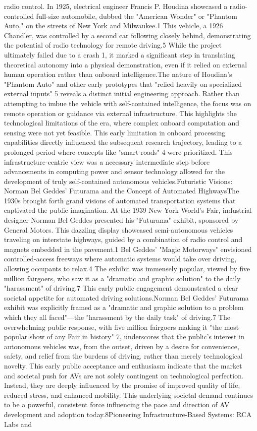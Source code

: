 radio control. In 1925, electrical engineer Francis P. Houdina showcased a radio-controlled full-size automobile, dubbed the "American Wonder" or "Phantom Auto," on the streets of New York and Milwaukee.1 This vehicle, a 1926 Chandler, was controlled by a second car following closely behind, demonstrating the potential of radio technology for remote driving.5 While the project ultimately failed due to a crash 1, it marked a significant step in translating theoretical autonomy into a physical demonstration, even if it relied on external human operation rather than onboard intelligence.The nature of Houdina's "Phantom Auto" and other early prototypes that "relied heavily on specialized external inputs" 5 reveals a distinct initial engineering approach. Rather than attempting to imbue the vehicle with self-contained intelligence, the focus was on remote operation or guidance via external infrastructure. This highlights the technological limitations of the era, where complex onboard computation and sensing were not yet feasible. This early limitation in onboard processing capabilities directly influenced the subsequent research trajectory, leading to a prolonged period where concepts like "smart roads" 4 were prioritized. This infrastructure-centric view was a necessary intermediate step before advancements in computing power and sensor technology allowed for the development of truly self-contained autonomous vehicles.Futuristic Visions: Norman Bel Geddes' Futurama and the Concept of Automated HighwaysThe 1930s brought forth grand visions of automated transportation systems that captivated the public imagination. At the 1939 New York World's Fair, industrial designer Norman Bel Geddes presented his "Futurama" exhibit, sponsored by General Motors. This dazzling display showcased semi-autonomous vehicles traveling on interstate highways, guided by a combination of radio control and magnets embedded in the pavement.1 Bel Geddes' "Magic Motorways" envisioned controlled-access freeways where automatic systems would take over driving, allowing occupants to relax.4 The exhibit was immensely popular, viewed by five million fairgoers, who saw it as a "dramatic and graphic solution" to the daily "harassment" of driving.7 This early public engagement demonstrated a clear societal appetite for automated driving solutions.Norman Bel Geddes' Futurama exhibit was explicitly framed as a "dramatic and graphic solution to a problem which they all faced"—the "harassment by the daily task" of driving.7 The overwhelming public response, with five million fairgoers making it "the most popular show of any Fair in history" 7, underscores that the public's interest in autonomous vehicles was, from the outset, driven by a desire for convenience, safety, and relief from the burdens of driving, rather than merely technological novelty. This early public acceptance and enthusiasm indicate that the market and societal push for AVs are not solely contingent on technological perfection. Instead, they are deeply influenced by the promise of improved quality of life, reduced stress, and enhanced mobility. This underlying societal demand continues to be a powerful, consistent force influencing the pace and direction of AV development and adoption today.8Pioneering Infrastructure-Based Systems: RCA Labs and 